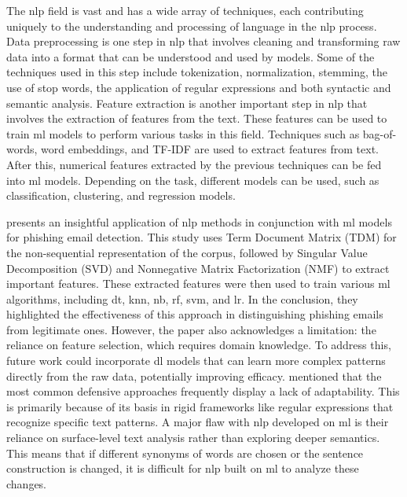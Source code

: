 The \ac{nlp} field is vast and has a wide array of techniques, each contributing uniquely to the understanding and processing of language in the \ac{nlp} process. Data preprocessing is one step in \ac{nlp} that involves cleaning and transforming raw data into a format that can be understood and used by models. Some of the techniques used in this step include tokenization, normalization, stemming, the use of stop words, the application of regular expressions and both syntactic and semantic analysis.
Feature extraction is another important step in \ac{nlp} that involves the extraction of features from the text. These features can be used to train \ac{ml} models to perform various tasks in this field. Techniques such as bag-of-words, word embeddings, and TF-IDF are used to extract features from text.
After this, numerical features extracted by the previous techniques can be fed into \ac{ml} models. Depending on the task, different models can be used, such as classification, clustering, and regression models.

\citet{Vazhayil201869} presents an insightful application of \ac{nlp} methods in conjunction with \ac{ml} models for phishing email detection. This study uses Term Document Matrix (TDM) for the non-sequential representation of the corpus, followed by Singular Value Decomposition (SVD) and Nonnegative Matrix Factorization (NMF) to extract important features. These extracted features were then used to train various \ac{ml} algorithms, including \ac{dt}, \ac{knn}, \ac{nb}, \ac{rf}, \ac{svm}, and \ac{lr}. In the conclusion, they highlighted the effectiveness of this approach in distinguishing phishing emails from legitimate ones. However, the paper also acknowledges a limitation: the reliance on feature selection, which requires domain knowledge. To address this, future work could incorporate \ac{dl} models that can learn more complex patterns directly from the raw data, potentially improving efficacy. \citet{Gutierrez2018988} mentioned that the most common defensive approaches frequently display a lack of adaptability. This is primarily because of its basis in rigid frameworks like regular expressions that recognize specific text patterns. A major flaw with \ac{nlp} developed on \ac{ml} is their reliance on surface-level text analysis rather than exploring deeper semantics. This means that if different synonyms of words are chosen or the sentence construction is changed, it is difficult for \ac{nlp} built on \ac{ml} to analyze these changes.

